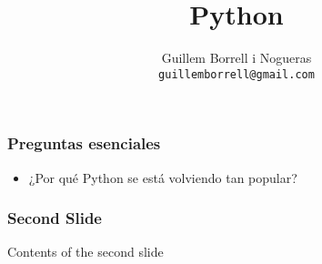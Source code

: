 \documentclass{beamer}
\title{Python}
\author{
Guillem Borrell i Nogueras\\
\texttt{guillemborrell@gmail.com}
}
\begin{document}
\begin{frame}
 
\end{frame}


\begin{frame}
 \frametitle{Preguntas esenciales}
 \begin{itemize}
 \item ¿Por qué Python se está volviendo tan popular?
 \end{itemize}

\end{frame}

\begin{frame}
 \frametitle{Second Slide}
 Contents of the second slide
\end{frame}
\end{document}
